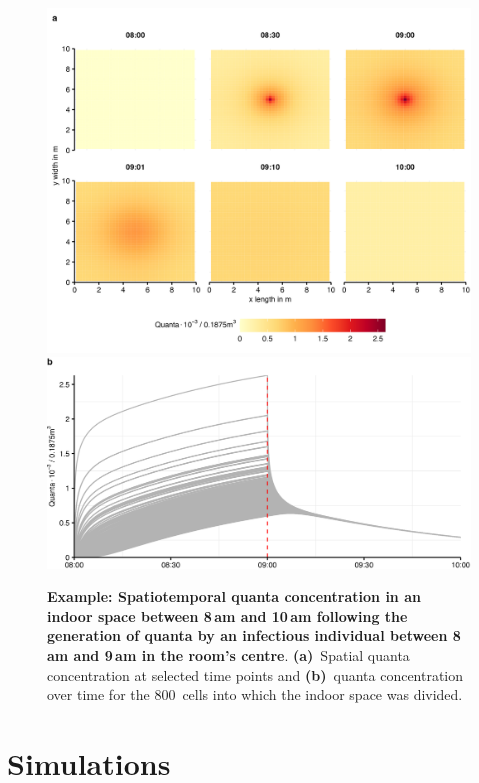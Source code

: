 \documentclass[fleqn,11pt]{wlscirep_supp}
\begin{document}
\begin{figure}[!htpb]
    \centering
    \includegraphics{tests/stm_v2-toy_example.png}
    \includegraphics{tests/stm_v2-toy_example-B.png}
    \caption[Example: Spatiotemporal quanta concentration in an indoor space]{\textbf{Example: Spatiotemporal quanta concentration in an indoor space between 8\,am and 10\,am following the generation of quanta by an infectious individual between 8\,am and 9\,am in the room's centre}. \textbf{(a)}~Spatial quanta concentration at selected time points and \textbf{(b)}~quanta concentration over time for the 800~cells into which the indoor space was divided.}
    \label{fig:toy-example}
\end{figure}

\clearpage


\section{Simulations}\label{sec:estimation}
\end{document}
